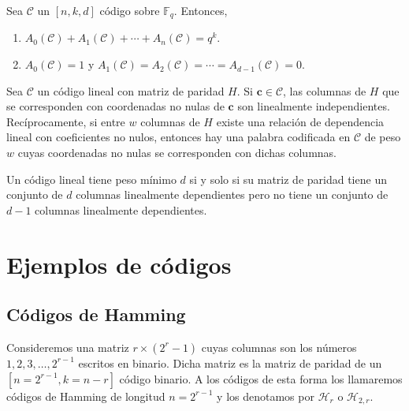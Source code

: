 \begin{theorem}
  Sea \(\mathcal C\) un \([n,k,d]\) código sobre \(\mathbb F_q\).
  Entonces, \begin{enumerate}
    \item \(A_0(\mathcal C) + A_1(\mathcal C) + \cdots + A_n(\mathcal C) = q^k\).
    \item \(A_0(\mathcal C) = 1\) y \(A_1(\mathcal C) = A_2(\mathcal C) = \cdots = A_{d-1}(\mathcal C) = 0\).
  \end{enumerate}
\end{theorem}


\begin{theorem}
  Sea \(\mathcal C\) un código lineal con matriz de paridad \(H\). Si \(\symbf{c} \in \mathcal C\), las columnas de \(H\) que se corresponden con coordenadas no nulas de \(\symbf{c}\) son linealmente independientes.
  Recíprocamente, si entre \(w\) columnas de \(H\) existe una relación de dependencia lineal con coeficientes no nulos, entonces hay una palabra codificada en \(\mathcal C\) de peso \(w\) cuyas coordenadas no nulas se corresponden con dichas columnas.
\end{theorem}

\begin{corollary}
  \label{cor:peso-minimo-columnas-dependientes}
  Un código lineal tiene peso mínimo \(d\) si y solo si su matriz de paridad tiene un conjunto de \(d\) columnas linealmente dependientes pero no tiene un conjunto de \(d-1\) columnas linealmente dependientes.
\end{corollary}


\section{Ejemplos de códigos}

\subsection{Códigos de Hamming}

Consideremos una matriz \(r \times (2^r - 1)\) cuyas columnas son los números \(1, 2, 3, \dots, 2^{r-1}\) escritos en binario. 
Dicha matriz es la matriz de paridad de un \([n=2^{r-1}, k=n-r]\) código binario.
A los códigos de esta forma los llamaremos códigos de Hamming de longitud \(n = 2^{r-1}\) y los denotamos por \(\mathcal H_r\) o \(\mathcal H_{2,r}\).

